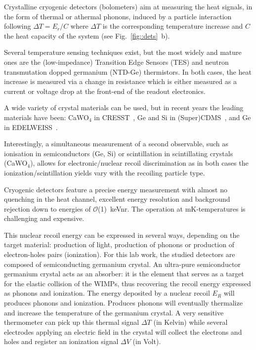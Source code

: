 Crystalline cryogenic detectors (bolometers) aim at measuring the heat signals, in the form of thermal or athermal phonons, induced by a particle interaction following $\Delta T = E_r/C$ where $\Delta T$ is the corresponding temperature increase and $C$ the heat capacity of the system (see Fig.~\ref{fig::dets}~b). 

Several temperature sensing techniques exist, but the most widely and mature ones are the (low-impedance) Transition Edge Sensors (TES) and neutron transmutation dopped germanium (NTD-Ge) thermistors.
In both cases, the heat increase is measured via a change in resistance which is either measured as a current or voltage drop at the front-end of the readout electronics.

A wide variety of crystal materials can be used, but in recent years the leading materials have been: CaWO$_4$ in CRESST~\cite{Abdelhameed:2019hmk}, Ge and Si in (Super)CDMS~\cite{Agnese:2013ixa}, and Ge in EDELWEISS~\cite{Armengaud:2017rzu}.

Interestingly, a simultaneous measurement of a second observable, such as ionisation in semiconductors (Ge, Si) or scintillation in scintillating crystals (CaWO$_4$), allows for electronic/nuclear recoil discrimination as in both cases the ionization/scintillation yields vary with the recoiling particle type.

Cryogenic detectors feature a precise energy measurement with almost no quenching in the heat channel, excellent energy resolution and background rejection down to energies of $\mathcal{O}$(1)~keVnr. The operation at mK-temperatures is challenging and expensive.

This nuclear recoil energy can be expressed in several ways, depending on the target material: production of light, production of phonons or production of electron-holes pairs (ionization). For this lab work, the studied detectors are composed of semiconducting germanium crystal. 
An ultra-pure semiconductor germanium crystal acts as an absorber: it is the element that serves as a target for the elastic collision of the WIMPs, thus recovering the recoil energy expressed as phonons and ionization. 
The energy deposited by a nuclear recoil $E_R$ will produces phonons and ionization. Produces phonons will eventually thermalize and increase the temperature of the germanium crystal. A very sensitive thermometer can pick up this thermal signal $\Delta T$ (in Kelvin) while several electrodes applying an electric field in the crystal will collect the electrons and holes and register an ionization signal $\Delta V$ (in Volt). 

